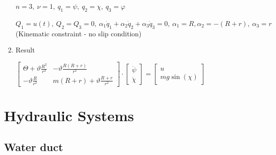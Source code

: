 \documentclass[10pt,a4paper]{scrartcl}
\begin{document}
\begin{multicols*}{3}
\begin{enumerate}
$n=3,\ \nu=1,\ q_1=\psi,\ q_2=\chi,\ q_3=\varphi$


$Q_1=u(t),\ Q_2=Q_3=0,\ \alpha_1\dot{q}_1+\alpha_2\dot{q}_2+\alpha_3\dot{q}_3=0,\ \alpha_1=R,\alpha_2=-(R+r),\ \alpha_3=r$ (Kinematic constraint - no slip condition)

\item Result

$\begin{bmatrix} \Theta+\vartheta \frac{R^2}{r^2}&-\vartheta\frac{R(R+r)}{r^2}\\-\vartheta\frac{R}{r^2}&m(R+r)+\vartheta\frac{R+r}{r^2}\end{bmatrix}\cdot\begin{bmatrix}\ddot{\psi}\\\ddot{\chi}\end{bmatrix}=\begin{bmatrix}u\\mg\sin(\chi)\end{bmatrix}$

\end{enumerate}

\vfill
\null
\columnbreak

\section{Hydraulic Systems}

\subsection{Water duct}




\finn



\end{multicols*}
\end{document}
